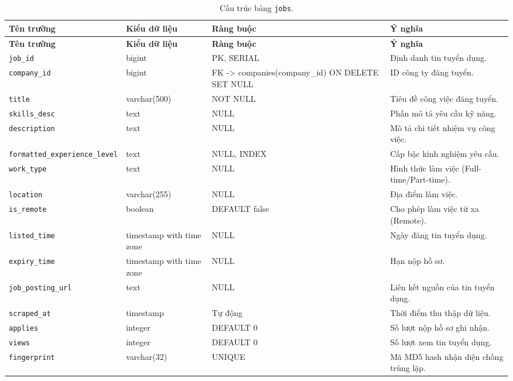 \begin{footnotesize}\begin{longtable}{|L{3.5cm}|L{2.0cm}|L{3.0cm}|L{5.5cm}|}
\caption{Cấu trúc bảng \texttt{jobs}.}
\label{tab:jobs} \\
\hline
\textbf{Tên trường} & \textbf{Kiểu dữ liệu} & \textbf{Ràng buộc} & \textbf{Ý nghĩa} \\
\hline
\endfirsthead
\hline
\textbf{Tên trường} & \textbf{Kiểu dữ liệu} & \textbf{Ràng buộc} & \textbf{Ý nghĩa} \\
\hline
\endhead
\texttt{job\_id} & bigint & PK, SERIAL & Định danh tin tuyển dụng. \\
\hline
\texttt{company\_id} & bigint & FK -> companies(company\_id) ON DELETE SET NULL & ID công ty đăng tuyển. \\
\hline
\texttt{title} & varchar(500) & NOT NULL & Tiêu đề công việc đăng tuyển. \\
\hline
\texttt{skills\_desc} & text & NULL & Phần mô tả yêu cầu kỹ năng. \\
\hline
\texttt{description} & text & NULL & Mô tả chi tiết nhiệm vụ công việc. \\
\hline
\texttt{formatted\_\allowbreak experience\_\allowbreak level} & text & NULL, INDEX & Cấp bậc kinh nghiệm yêu cầu. \\
\hline
\texttt{work\_type} & text & NULL & Hình thức làm việc (Full-time/Part-time). \\
\hline
\texttt{location} & varchar(255) & NULL & Địa điểm làm việc. \\
\hline
\texttt{is\_remote} & boolean & DEFAULT false & Cho phép làm việc từ xa (Remote). \\
\hline
\texttt{listed\_time} & timestamp with time zone & NULL & Ngày đăng tin tuyển dụng. \\
\hline
\texttt{expiry\_time} & timestamp with time zone & NULL & Hạn nộp hồ sơ. \\
\hline
\texttt{job\_\allowbreak posting\_\allowbreak url} & text & NULL & Liên kết nguồn của tin tuyển dụng. \\
\hline
\texttt{scraped\_at} & timestamp & Tự động & Thời điểm thu thập dữ liệu. \\
\hline
\texttt{applies} & integer & DEFAULT 0 & Số lượt nộp hồ sơ ghi nhận. \\
\hline
\texttt{views} & integer & DEFAULT 0 & Số lượt xem tin tuyển dụng. \\
\hline
\texttt{fingerprint} & varchar(32) & UNIQUE & Mã MD5 hash nhận diện chống trùng lặp. \\

\end{longtable}
\end{footnotesize}

